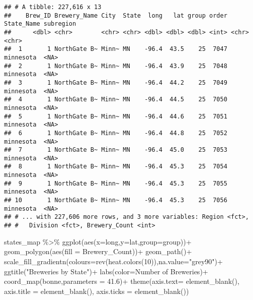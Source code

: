 \documentclass[
]{article}
\newenvironment{Shaded}{\begin{snugshade}}{\end{snugshade}}
\newcommand{\AttributeTok}[1]{\textcolor[rgb]{0.77,0.63,0.00}{#1}}
\newcommand{\DecValTok}[1]{\textcolor[rgb]{0.00,0.00,0.81}{#1}}
\newcommand{\FloatTok}[1]{\textcolor[rgb]{0.00,0.00,0.81}{#1}}
\newcommand{\FunctionTok}[1]{\textcolor[rgb]{0.00,0.00,0.00}{#1}}
\newcommand{\NormalTok}[1]{#1}
\newcommand{\SpecialCharTok}[1]{\textcolor[rgb]{0.00,0.00,0.00}{#1}}
\newcommand{\StringTok}[1]{\textcolor[rgb]{0.31,0.60,0.02}{#1}}
\begin{document}
\begin{verbatim}
## # A tibble: 227,616 x 13
##    Brew_ID Brewery_Name City  State  long   lat group order State_Name subregion
##      <dbl> <chr>        <chr> <chr> <dbl> <dbl> <dbl> <int> <chr>      <chr>    
##  1       1 NorthGate B~ Minn~ MN    -96.4  43.5    25  7047 minnesota  <NA>     
##  2       1 NorthGate B~ Minn~ MN    -96.4  43.9    25  7048 minnesota  <NA>     
##  3       1 NorthGate B~ Minn~ MN    -96.4  44.2    25  7049 minnesota  <NA>     
##  4       1 NorthGate B~ Minn~ MN    -96.4  44.5    25  7050 minnesota  <NA>     
##  5       1 NorthGate B~ Minn~ MN    -96.4  44.6    25  7051 minnesota  <NA>     
##  6       1 NorthGate B~ Minn~ MN    -96.4  44.8    25  7052 minnesota  <NA>     
##  7       1 NorthGate B~ Minn~ MN    -96.4  45.0    25  7053 minnesota  <NA>     
##  8       1 NorthGate B~ Minn~ MN    -96.4  45.3    25  7054 minnesota  <NA>     
##  9       1 NorthGate B~ Minn~ MN    -96.4  45.3    25  7055 minnesota  <NA>     
## 10       1 NorthGate B~ Minn~ MN    -96.4  45.3    25  7056 minnesota  <NA>     
## # ... with 227,606 more rows, and 3 more variables: Region <fct>,
## #   Division <fct>, Brewery_Count <int>
\end{verbatim}

\begin{Shaded}
\begin{Highlighting}[]
\NormalTok{states\_map }\SpecialCharTok{\%\textgreater{}\%}
   \FunctionTok{ggplot}\NormalTok{(}\FunctionTok{aes}\NormalTok{(}\AttributeTok{x=}\NormalTok{long,}\AttributeTok{y=}\NormalTok{lat,}\AttributeTok{group=}\NormalTok{group))}\SpecialCharTok{+}
   \FunctionTok{geom\_polygon}\NormalTok{(}\FunctionTok{aes}\NormalTok{(}\AttributeTok{fill =}\NormalTok{ Brewery\_Count))}\SpecialCharTok{+}
   \FunctionTok{geom\_path}\NormalTok{()}\SpecialCharTok{+} 
   \FunctionTok{scale\_fill\_gradientn}\NormalTok{(}\AttributeTok{colours=}\FunctionTok{rev}\NormalTok{(}\FunctionTok{heat.colors}\NormalTok{(}\DecValTok{10}\NormalTok{)),}\AttributeTok{na.value=}\StringTok{"grey90"}\NormalTok{)}\SpecialCharTok{+}
   \FunctionTok{ggtitle}\NormalTok{(}\StringTok{"Breweries by State"}\NormalTok{)}\SpecialCharTok{+}
   \FunctionTok{labs}\NormalTok{(}\AttributeTok{color=}\StringTok{\textquotesingle{}Number of Breweries\textquotesingle{}}\NormalTok{)}\SpecialCharTok{+}
   \FunctionTok{coord\_map}\NormalTok{(}\StringTok{\textquotesingle{}bonne\textquotesingle{}}\NormalTok{,}\AttributeTok{parameters =} \FloatTok{41.6}\NormalTok{)}\SpecialCharTok{+}
   \FunctionTok{theme}\NormalTok{(}\AttributeTok{axis.text=} \FunctionTok{element\_blank}\NormalTok{(),}
         \AttributeTok{axis.title =} \FunctionTok{element\_blank}\NormalTok{(),}
         \AttributeTok{axis.ticks =} \FunctionTok{element\_blank}\NormalTok{())}
\end{Highlighting}
\end{Shaded}
\end{document}
